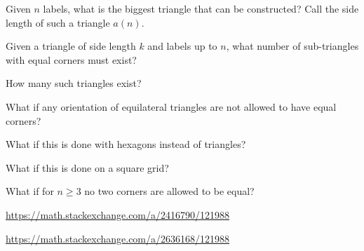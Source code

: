 \documentclass{article}
\begin{document}
\begin{question}
  Given $n$ labels, what is the biggest triangle that can be constructed?
  Call the side length of such a triangle $a(n)$.
\end{question}
\begin{related}
  \item Given a triangle of side length $k$ and labels up to $n$, what number
    of sub-triangles with equal corners must exist?
  \item How many such triangles exist?
  \item What if any orientation of equilateral triangles are not allowed to have equal corners?
  \item What if this is done with hexagons instead of triangles?
  \item What if this is done on a square grid?
  \item What if for $n \geq 3$ no two corners are allowed to be equal?
\end{related}
\begin{references}
  \item \url{https://math.stackexchange.com/a/2416790/121988}
  \item \url{https://math.stackexchange.com/a/2636168/121988}
\end{references}
\end{document}
